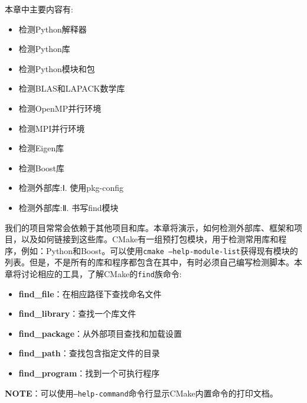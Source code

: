 本章中主要内容有:

\begin{itemize}
\item 检测Python解释器

\item 检测Python库

\item 检测Python模块和包

\item 检测BLAS和LAPACK数学库

\item 检测OpenMP并行环境

\item 检测MPI并行环境

\item 检测Eigen库

\item 检测Boost库

\item 检测外部库:Ⅰ. 使用pkg-config

\item 检测外部库:Ⅱ. 书写find模块

\end{itemize}

我们的项目常常会依赖于其他项目和库。本章将演示，如何检测外部库、框架和项目，以及如何链接到这些库。CMake有一组预打包模块，用于检测常用库和程序，例如：Python和Boost。可以使用\texttt{cmake --help-module-list}获得现有模块的列表。但是，不是所有的库和程序都包含在其中，有时必须自己编写检测脚本。本章将讨论相应的工具，了解CMake的\texttt{find}族命令:

\begin{itemize}
\item \textbf{find\_file}：在相应路径下查找命名文件

\item \textbf{find\_library}：查找一个库文件

\item \textbf{find\_package}：从外部项目查找和加载设置

\item \textbf{find\_path}：查找包含指定文件的目录

\item \textbf{find\_program}：找到一个可执行程序

\end{itemize}

\begin{myInfoBox}
\textbf{NOTE}：可以使用\texttt{--help-command}命令行显示CMake内置命令的打印文档。
\end{myInfoBox}


